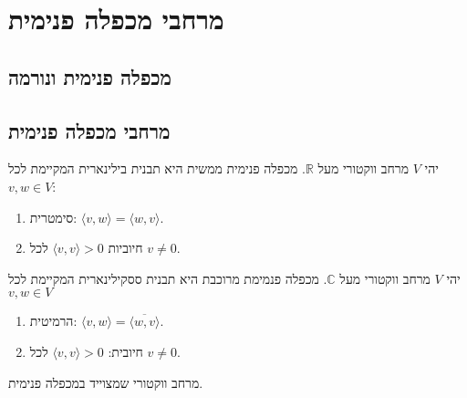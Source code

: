 \documentclass{tstextbook}
\begin{document}
\chapter{מרחבי מכפלה פנימית}

\section{מכפלה פנימית ונורמה}

\section{מרחבי מכפלה פנימית}

\begin{definition}
יהי \(V\) מרחב ווקטורי מעל \(\mathbb{R}\). מכפלה פנימית ממשית היא תבנית בילינארית המקיימת לכל \(v,w \in V\):

  \begin{enumerate}
    \item סימטרית: \(\langle v, w \rangle = \langle w, v \rangle\). 


    \item חיוביות \(\langle v, v \rangle > 0\) לכל \(v\neq 0\). 


  \end{enumerate}
\end{definition}
\begin{definition}
יהי \(V\) מרחב ווקטורי מעל \(\mathbb{C}\). מכפלה פנמימת מרוכבת היא תבנית ססקילינארית המקיימת לכל \(v,w \in V\)

  \begin{enumerate}
    \item הרמיטית: \(\langle v, w \rangle = \overline{\langle w, v \rangle}\). 


    \item חיובית: \(\langle v, v \rangle > 0\) לכל \(v\neq 0\). 


  \end{enumerate}
\end{definition}
\begin{definition}
מרחב ווקטורי שמצוייד במכפלה פנימית.

\end{definition}
\end{document}
